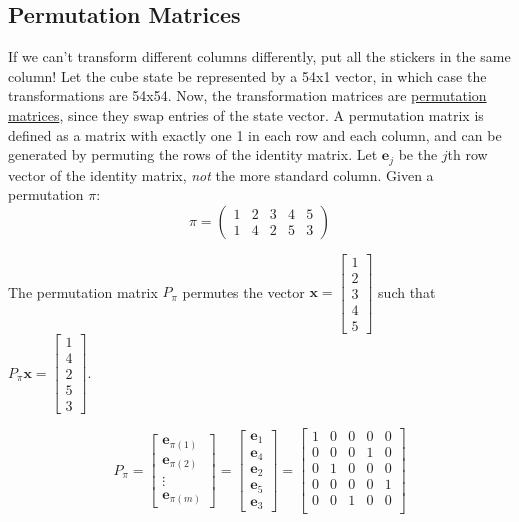 \documentclass[11pt, oneside]{article}
\newcommand{\ve}[1]{\mathbf{#1}}
\theoremstyle{plain}
\begin{document}
\subsection{Permutation Matrices}
If we can't transform different columns differently, put all the stickers in
the same column! Let the cube state be represented by a 54x1 vector, in which
case the transformations are 54x54. Now, the transformation matrices are
\href{https://en.wikipedia.org/wiki/Permutation_matrix}{permutation matrices},
since they swap entries of the state vector. A permutation matrix is defined as
a matrix with exactly one 1 in each row and each column, and can be generated
by permuting the rows of the identity matrix. Let \( \ve{e}_j \) be the \( j
\)th row vector of the identity matrix, \textit{not} the more standard column.
Given a permutation \( \pi \):
\[ \pi = \begin{pmatrix}
         1 & 2 & 3 & 4 & 5 \\
         1 & 4 & 2 & 5 & 3
        \end{pmatrix}
\]

The permutation matrix \( P_{\pi} \) permutes the vector
\( \ve{x} = \begin{bmatrix} 1 \\ 2 \\ 3 \\ 4 \\ 5 \end{bmatrix} \) such that
\( P_{\pi}\ve{x} = \begin{bmatrix} 1 \\ 4 \\ 2 \\ 5 \\ 3 \end{bmatrix} \).

\[ P_{\pi} = \begin{bmatrix} \ve{e}_{\pi(1)} \\ \ve{e}_{\pi(2)} \\ \vdots \\ \ve{e}_{\pi(m)} \end{bmatrix} =
\begin{bmatrix} \ve{e}_{1} \\ \ve{e}_{4} \\ \ve{e}_{2} \\ \ve{e}_{5}  \\ \ve{e}_{3} \end{bmatrix} =
\begin{bmatrix}
1 & 0 & 0 & 0 & 0 \\
0 & 0 & 0 & 1 & 0 \\
0 & 1 & 0 & 0 & 0 \\
0 & 0 & 0 & 0 & 1 \\
0 & 0 & 1 & 0 & 0 \\
\end{bmatrix} \]
\end{document}
